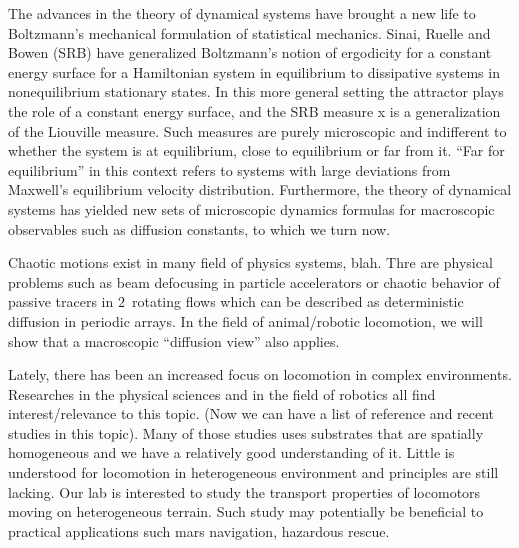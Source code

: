 


The advances in the theory of dynamical systems have brought a new life to
Boltzmann's mechanical formulation of statistical mechanics. Sinai, Ruelle and
Bowen (SRB) have generalized Boltzmann's notion of ergodicity for a constant
energy surface for a Hamiltonian system in equilibrium to dissipative systems in
{nonequilibrium} stationary states. In this more general setting the attractor
plays the role of a constant energy surface, and the SRB measure x is a
generalization of the Liouville measure. Such measures are purely microscopic
and indifferent to whether the system is at equilibrium, close to equilibrium or
far from it.  ``Far for equilibrium'' in this context refers to systems with
large deviations from Maxwell's equilibrium velocity distribution. Furthermore,
the theory of dynamical systems has yielded new sets of microscopic dynamics
formulas for macroscopic observables such as diffusion constants, to which we turn now.
%
%

Chaotic motions exist in many field of physics systems, blah. Thre are physical
problems such as beam defocusing in particle accelerators or chaotic behavior of
passive tracers in $2$\dmn\ rotating flows which can be described as
deterministic diffusion in periodic arrays. In the field of animal/robotic
locomotion, we will show that a macroscopic ``diffusion view'' also applies.

Lately, there has been an increased focus on locomotion in complex environments. Researches in the physical sciences and in the field of robotics all find interest/relevance to this topic. (Now we can have a list of reference and recent studies in this topic). Many of those studies uses substrates that are spatially homogeneous and we have a relatively good understanding of it. Little is understood for locomotion in heterogeneous environment and principles are still lacking. Our lab is interested to study the transport properties of locomotors moving on heterogeneous terrain. Such study may potentially be beneficial to practical applications such mars navigation, hazardous rescue.

